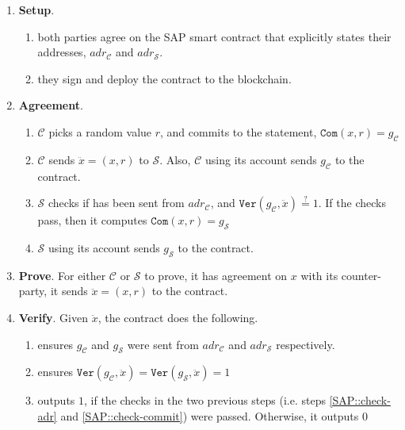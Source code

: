  \begin{enumerate}
 \item\textbf{Setup}.  

 \begin{enumerate}
  \item both parties agree on the SAP smart contract that  explicitly states their addresses, $adr_{\scriptscriptstyle\mathcal{C}}$ and $adr_{\scriptscriptstyle\mathcal{S}}$.
 \item they sign and deploy the contract to the blockchain.
   \end{enumerate}
    \item\textbf{Agreement}.
  \begin{enumerate}
   \item $\mathcal C$ picks a random value $r$, and commits to the statement, $\mathtt{Com}(x,r)=g_{\scriptscriptstyle \mathcal{C}}$
   
   
   \item $\mathcal C$ sends $\ddot{x}=(x,r)$  to  $\mathcal S$. Also, $\mathcal C$ using its account sends $g_{\scriptscriptstyle\mathcal C}$ to the contract. 
   \item $\mathcal S$ checks if has been sent from $adr_{\scriptscriptstyle \mathcal{C}}$, and $\mathtt{Ver}(g_{\scriptscriptstyle\mathcal C}, \ddot{x})\stackrel{?}=1$. If the checks pass, then  it computes $\mathtt{Com}(x,r)=g_{\scriptscriptstyle\mathcal S}$
   
   \item $\mathcal S$ using its account sends   $g_{\scriptscriptstyle\mathcal S}$ to the contract. 
    \end{enumerate}
   \item\textbf{Prove}. For either $\mathcal C$ or $\mathcal S$ to prove, it has agreement on $x$ with its counter-party, it sends $\ddot{x}=(x, r)$  to the contract. 
 \item\textbf{Verify}. Given $\ddot{x}$, the contract does the following. 
   \begin{enumerate}
   
\item\label{SAP::check-adr} ensures $g_{\scriptscriptstyle\mathcal C}$ and $g_{\scriptscriptstyle\mathcal S}$ were sent from   $adr_{\scriptscriptstyle \mathcal{C}}$ and  $adr_{\scriptscriptstyle \mathcal{S}}$  respectively. 
  
   \item\label{SAP::check-commit} ensures $\mathtt{Ver}(g_{\scriptscriptstyle\mathcal C},\ddot{x})=\mathtt{Ver}(g_{\scriptscriptstyle\mathcal S},\ddot{x}) =1$
   
   \item outputs $1$, if the checks in the two previous steps (i.e. steps \ref{SAP::check-adr} and \ref{SAP::check-commit}) were passed. Otherwise, it outputs $0$
    \end{enumerate}
 \end{enumerate}

